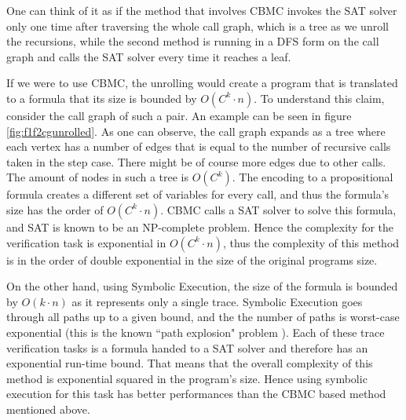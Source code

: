 One can think of it as if the method that involves CBMC invokes the SAT solver only one time after traversing the whole call graph, which is a tree as we unroll the recursions, while the second method is running in a DFS form on the call graph and calls the SAT solver every time it reaches a leaf.

If we were to use CBMC, the unrolling would create a program that is translated to a formula that its size is bounded by $O(C^k{\cdot}n)$. To understand this claim, consider the call graph of such a pair. An example can be seen in figure \ref{fig:f1f2cgunrolled}. As one can observe, the call graph expands as a tree where each vertex has a number of edges that is equal to the number of recursive calls taken in the step case. There might be of course more edges due to other calls. The amount of nodes in such a tree is $O(C^k)$. The encoding to a propositional formula creates a different set of variables for every call, and thus the formula's size has the order of $O(C^k{\cdot}n)$. CBMC calls a SAT solver to solve this formula, and SAT is known to be an NP-complete problem. Hence the complexity for the verification task is exponential in $O(C^k{\cdot}n)$, thus the complexity of this method is in the order of double exponential in the size of the original programs size. 

On the other hand, using Symbolic Execution, the size of the formula is bounded by $O(k{\cdot}n)$ as it represents only a single trace. Symbolic Execution goes through all paths up to a given bound, and the the number of paths is worst-case exponential (this is the known ``path explosion" problem  \cite{10.1007/978-3-540-78800-3_28}). Each of these trace verification tasks is a formula handed to a SAT solver and therefore has an exponential run-time bound. That means that the overall complexity of this method is exponential squared in the program's size. 
Hence using symbolic execution for this task has better performances than the CBMC based method mentioned above.


